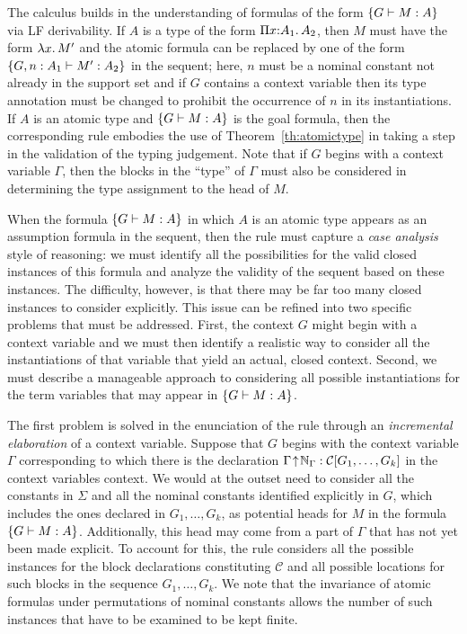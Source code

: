 The calculus builds in the understanding of formulas of the form
$\left\{G \vdash M : A\right\}$ via LF derivability.
%
If $A$ is a type of the form $\Pi {x}{:}{A_1}.{\mkern 3mu} A_2$, then $M$ must
have the form $\lambda {x}.{\mkern 3mu} M'$ and the atomic formula can be replaced
by one of the form $\left\{G,n:A_1 \vdash M':A_2\right\}$ in the sequent; here, $n$
must be a nominal constant not already in the support set and if $G$
contains a context variable then its type annotation must be changed
to prohibit the occurrence of $n$ in its instantiations.
%
If $A$ is an atomic type and $\left\{G \vdash M : A\right\}$ is the goal formula,
then the corresponding rule embodies the use of
Theorem~\ref{th:atomictype} in taking a step in the
validation of the typing judgement.
%
Note that if $G$ begins with a context variable $\Gamma$, then the
blocks in the ``type'' of $\Gamma$ must also be considered in
determining the type assignment to the head of $M$. 

When the formula $\left\{G \vdash M : A\right\}$ in which $A$ is an atomic type
appears as an assumption formula in the sequent, then the rule must
capture a \emph{case analysis} style of reasoning: 
we must identify all the possibilities for the valid
closed instances of this formula and analyze the validity of the
sequent based on these instances.
%
The difficulty, however, is that there may be far too many closed
instances to consider explicitly.
%
This issue can be refined into two specific problems that must be
addressed. 
%
First, the context $G$ might begin with a context variable and we must
then identify a realistic way to consider all the instantiations of that
variable that yield an actual, closed context.
%
Second, we must describe a manageable approach to considering all
possible instantiations for the term variables that may appear in
$\left\{G \vdash M : A\right\}$. 

The first problem is solved in the enunciation of the rule through an
\emph{incremental elaboration} of a context variable.
%
Suppose that $G$ begins with the context variable $\Gamma$
corresponding to which there is the declaration
$\Gamma\!\uparrow\!\mathbb{N}_{\Gamma} : \mathcal{C}\lbrack {G_1,\ldots,G_k}\rbrack$
in the context variables context.
%
We would at the outset need to consider all the constants in $\Sigma$
and all the nominal constants identified explicitly in $G$, which
includes the ones declared in $G_1,\ldots,G_k$, as potential heads for
$M$ in the formula $\left\{G \vdash M:A\right\}$.
%
Additionally, this head may come from a part of $\Gamma$ that has not
yet been made explicit.
%
To account for this, the rule considers all the possible instances for
the block declarations constituting $\mathcal{C}$ and all possible
locations for such blocks in the sequence $G_1,\ldots,G_k$.
%
We note that the invariance of atomic formulas under permutations of
nominal constants allows the number of such instances that have to be
examined to be kept finite.

